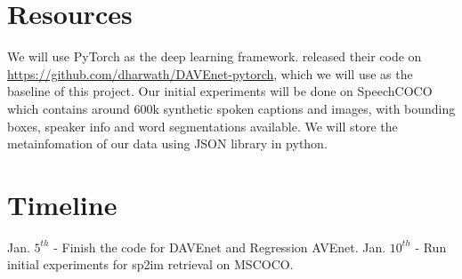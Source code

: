 \documentclass[a4paper]{article}
\begin{document}
\section{Resources}
We will use PyTorch as the deep learning framework. \cite{Harwath18} released their code
on \href{https://github.com/dharwath/DAVEnet-pytorch}{https://github.com/dharwath/DAVEnet-pytorch}, which we will use as the baseline of 
this project. Our initial experiments will be
done on SpeechCOCO \cite{Havard17} which contains around 600k synthetic spoken captions
and images, with bounding boxes, speaker info 
and word segmentations available. We will store the metainfomation
of our data using JSON library in python.

\section{Timeline}
Jan. $5^{th}$ - Finish the code for DAVEnet and
Regression AVEnet.
Jan. $10^{th}$ - Run initial experiments for sp2im retrieval on MSCOCO. 




\end{document}
